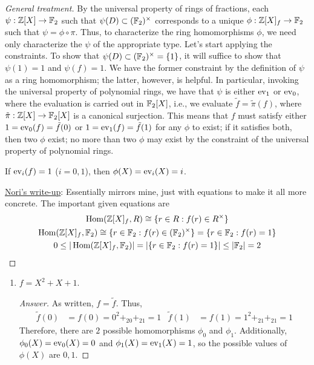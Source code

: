 \documentclass[../notes.tex]{subfiles}
\begin{document}
\begin{enumerate}
\begin{proof}[General treatment]
        By the universal property of rings of fractions, each $\psi:\mathbb{Z}[X]\to\mathbb{F}_2$ such that $\psi(D)\subset(\mathbb{F}_2)^\times$ corresponds to a unique $\phi:\mathbb{Z}[X]_f\to\mathbb{F}_2$ such that $\psi=\phi\circ\pi$. Thus, to characterize the ring homomorphisms $\phi$, we need only characterize the $\psi$ of the appropriate type. Let's start applying the constraints. To show that $\psi(D)\subset(\mathbb{F}_2)^\times=\{1\}$, it will suffice to show that $\psi(1)=1$ and $\psi(f)=1$. We have the former constraint by the definition of $\psi$ as a ring homomorphism; the latter, however, is helpful. In particular, invoking the universal property of polynomial rings, we have that $\psi$ is either $\operatorname{ev}_1$ or $\operatorname{ev}_0$, where the evaluation is carried out in $\mathbb{F}_2[X]$, i.e., we evaluate $\tilde{f}=\tilde{\pi}(f)$, where $\tilde{\pi}:\mathbb{Z}[X]\to\mathbb{F}_2[X]$ is a canonical surjection. This means that $f$ must satisfy either $1=\operatorname{ev}_0(f)=\tilde{f}(0)$ or $1=\operatorname{ev}_1(f)=\tilde{f}(1)$ for any $\phi$ to exist; if it satisfies both, then two $\phi$ exist; no more than two $\phi$ may exist by the constraint of the universal property of polynomial rings.\par
        If $\operatorname{ev}_i(f)=1$ ($i=0,1$), then $\phi(X)=\operatorname{ev}_i(X)=i$.\par
        \underline{Nori's write-up}: Essentially mirrors mine, just with equations to make it all more concrete. The important given equations are
        \begin{gather*}
            \operatorname{Hom}(\mathbb{Z}[X]_f,R) \cong \{r\in R:f(r)\in R^\times\}\\
            \operatorname{Hom}(\mathbb{Z}[X]_f,\mathbb{F}_2) \cong \{r\in\mathbb{F}_2:f(r)\in(\mathbb{F}_2)^\times\}
                = \{r\in\mathbb{F}_2:f(r)=1\}\\
            0 \leq |\operatorname{Hom}(\mathbb{Z}[X]_f,\mathbb{F}_2)|
                = |\{r\in\mathbb{F}_2:f(r)=1\}|
                \leq |\mathbb{F}_2|
                = 2
        \end{gather*}
    \end{proof}
    \begin{enumerate}
        \item $f=X^2+X+1$.
        \begin{proof}[Answer]
            As written, $f=\tilde{f}$. Thus,
            \begin{align*}
                \tilde{f}(0) &= f(0)
                    = 0^2+_20+_21
                    = 1&
                \tilde{f}(1) &= f(1)
                    = 1^2+_21+_21
                    = 1
            \end{align*}
            Therefore, there are $\boxed{2}$ possible homomorphisms $\phi_0$ and $\phi_1$. Additionally, $\phi_0(X)=\operatorname{ev}_0(X)=0$ and $\phi_1(X)=\operatorname{ev}_1(X)=1$, so the possible values of $\phi(X)$ are $\boxed{0,1}$.

\end{proof}
\end{enumerate}
\end{enumerate}
\end{document}
